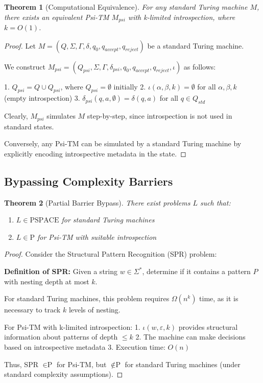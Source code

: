 \documentclass[11pt]{article}
\newtheorem{theorem}{Theorem}
\begin{document}
\begin{theorem}[Computational Equivalence]
For any standard Turing machine $M$, there exists an equivalent Psi-TM $M_{psi}$ with k-limited introspection, where $k = O(1)$.
\end{theorem}

\begin{proof}
Let $M = (Q, \Sigma, \Gamma, \delta, q_0, q_{accept}, q_{reject})$ be a standard Turing machine.

We construct $M_{psi} = (Q_{psi}, \Sigma, \Gamma, \delta_{psi}, q_0, q_{accept}, q_{reject}, \iota)$ as follows:

1. $Q_{psi} = Q \cup Q_{psi}$, where $Q_{psi} = \emptyset$ initially
2. $\iota(\alpha, \beta, k) = \emptyset$ for all $\alpha, \beta, k$ (empty introspection)
3. $\delta_{psi}(q, a, \emptyset) = \delta(q, a)$ for all $q \in Q_{std}$

Clearly, $M_{psi}$ simulates $M$ step-by-step, since introspection is not used in standard states.

Conversely, any Psi-TM can be simulated by a standard Turing machine by explicitly encoding introspective metadata in the state.
\end{proof}

\subsection{Bypassing Complexity Barriers}

\begin{theorem}[Partial Barrier Bypass]
There exist problems $L$ such that:
\begin{enumerate}
\item $L \in \text{PSPACE}$ for standard Turing machines
\item $L \in \text{P}$ for Psi-TM with suitable introspection
\end{enumerate}
\end{theorem}

\begin{proof}
Consider the Structural Pattern Recognition (SPR) problem:

\textbf{Definition of SPR:} Given a string $w \in \Sigma^*$, determine if it contains a pattern $P$ with nesting depth at most $k$.

For standard Turing machines, this problem requires $\Omega(n^k)$ time, as it is necessary to track $k$ levels of nesting.

For Psi-TM with k-limited introspection:
1. $\iota(w, \varepsilon, k)$ provides structural information about patterns of depth $\leq k$
2. The machine can make decisions based on introspective metadata
3. Execution time: $O(n)$

Thus, SPR $\in \text{P}$ for Psi-TM, but $\notin \text{P}$ for standard Turing machines (under standard complexity assumptions).
\end{proof}
\end{document}
